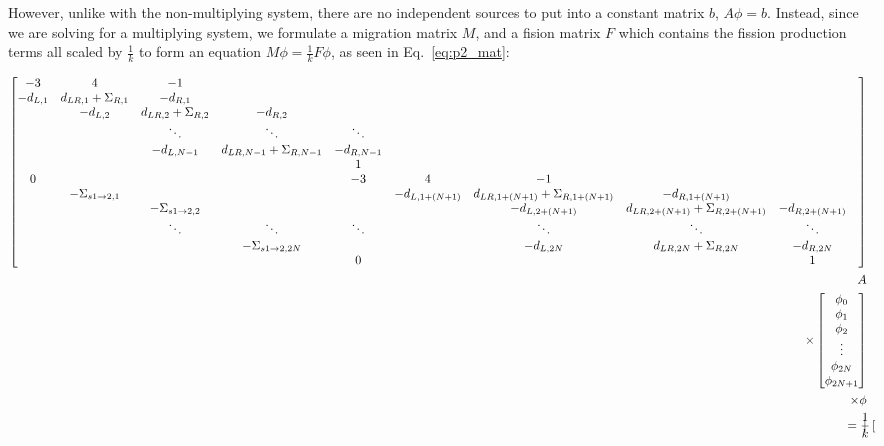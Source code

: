 \documentclass[11pt]{article} %
\begin{document}
However, unlike with the non-multiplying system, there are no independent sources to put into a constant matrix $b$, $A\phi=b$.
Instead, since we are solving for a multiplying system, we formulate a migration matrix $M$, and a fision matrix $F$ which contains the fission production terms all scaled by $\frac{1}{k}$ to form an equation $M\phi=\frac{1}{k}F\phi$, as seen in Eq.~\ref{eq:p2_mat}:

\newcommand{\fprod}[1]{\nu\Sigma_{f#1}}
\begin{landscape}
    \small
    \begin{equation}
        \begin{aligned}
    \begin{bmatrix}
        -3 & 4 & -1 & & &   &&&&  \\
        -d_{L,1} & d_{LR,1}+\Sigma_{R,1} & -d_{R,1} && &&&&\\
        & -d_{L,2} & d_{LR,2}+\Sigma_{R,2} & -d_{R,2} & &&&&\\
        &&\ddots& \ddots & \ddots &&&&\\
        &&-d_{L,N-1} & d_{LR,N-1}+\Sigma_{R,N-1} & -d_{R,N-1} &&&&\\
        &&&&1 &&&&\\
        0&&&& -3 & 4 & -1 & & &     \\
        &-\Sigma_{s1\rightarrow2,1}&&&&   -d_{L,1+(N+1)} & d_{LR,1+(N+1)}+\Sigma_{R,1+(N+1)} & -d_{R,1+(N+1)} &&\\
        &&-\Sigma_{s1\rightarrow2,2}&&&&   -d_{L,2+(N+1)} & d_{LR,2+(N+1)}+\Sigma_{R,2+(N+1)} & -d_{R,2+(N+1)} &\\
        &&\ddots& \ddots & \ddots &&\ddots& \ddots & \ddots\\
        && & -\Sigma_{s1\rightarrow2,2N} & &&-d_{L,2N} & d_{LR,2N}+\Sigma_{R,2N} & -d_{R,2N}\\
        &&&&0 &&&&1 \\
    \end{bmatrix}&\\
    A&\\
    \times\begin{bmatrix}
        \phi_0\\\phi_1\\\phi_2\\\vdots\\\phi_{2N}\\\phi_{2N+1}
    \end{bmatrix}&\\
    \times \phi&\\
    =
    \frac{1}{k}
    \begin{bmatrix}

\end{bmatrix}
\end{aligned}
\end{equation}
\end{landscape}
\end{document}
